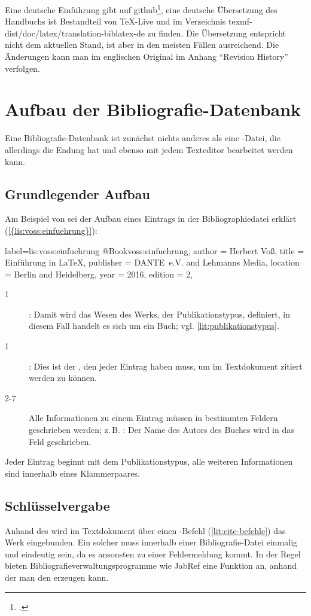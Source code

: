 Eine deutsche Einführung gibt auf github\footcite{biblatex-bottcher}, 
eine deutsche Übersetzung des Handbuchs ist Bestandteil von TeX-Live und im Verzeichnis 
texmf-dist/doc/latex/translation-biblatex-de zu finden.
Die Übersetzung entspricht nicht dem aktuellen Stand, ist aber in den meisten Fällen ausreichend.
Die Änderungen kann man im englischen Original im Anhang \enquote{Revision History} verfolgen.

\section{Aufbau der Bibliografie-Datenbank}\label{sec:bibliografiedatenbank}
Eine Bibliografie-Datenbank ist zunächst nichts anderes als eine -Datei,
die allerdings die Endung  hat und ebenso mit jedem Texteditor bearbeitet werden kann.

\subsection{Grundlegender Aufbau}
Am Beispiel von \cite{voss:einfuehrung} sei der Aufbau eines Eintrags in der Bibliographiedatei erklärt (\cref{{lis:voss:einfuehrung}}):

\begin{lfgwcode}{label={lis:voss:einfuehrung}}
@Book{voss:einfuehrung,
 author = {Herbert Voß}, 
 title = {Einführung in \LaTeX},
 publisher = {DANTE~e.V. and Lehmanns Media},
 location = {Berlin and Heidelberg},
 year = {2016},
 edition = {2},
}
\end{lfgwcode}

\begin{description}
 \item[1] : Damit wird das Wesen des Werks, der Publikationstypus, definiert, in diesem Fall handelt es sich um ein Buch; vgl. \cref{lit:publikationstypus}.
 \item[1] : Dies ist der , den jeder Eintrag haben muss, um im Textdokument zitiert werden zu können.
 \item[2-7] Alle Informationen zu einem Eintrag müssen in bestimmten Feldern geschrieben werden; z.\,B. : 
 Der Name des Autors des Buches wird in das Feld  geschrieben. 
\end{description}
Jeder Eintrag beginnt mit dem Publikationstypus, alle weiteren Informationen sind innerhalb eines Klammerpaares.
\subsection{Schlüsselvergabe}
Anhand des  wird im Textdokument über einen -Befehl (\cref{lit:cite-befehle}) das Werk eingebunden.
Ein solcher  muss innerhalb einer Bibliografie-Datei einmalig und eindeutig sein, 
da es ansonsten zu einer Fehlermeldung kommt.
In der Regel bieten Bibliografieverwaltungsprogramme wie JabRef eine Funktion an, anhand der man den  erzeugen kann. 

